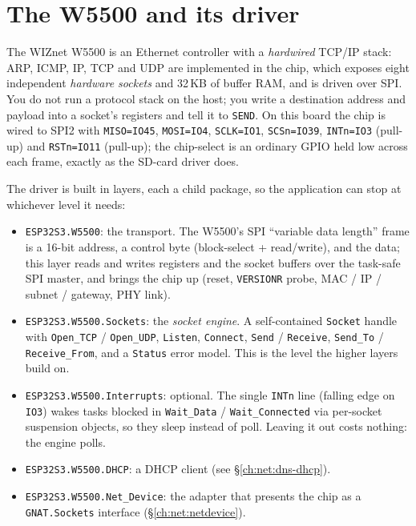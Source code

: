 \section{The W5500 and its driver}
\label{ch:net:w5500}

The WIZnet W5500 is an Ethernet controller with a \emph{hardwired} TCP/IP stack:
ARP, ICMP, IP, TCP and UDP are implemented in the chip, which exposes eight
independent \emph{hardware sockets} and 32\,KB of buffer RAM, and is driven over
SPI. You do not run a protocol stack on the host; you write a destination address
and payload into a socket's registers and tell it to \texttt{SEND}. On this board
the chip is wired to SPI2 with \texttt{MISO=IO45}, \texttt{MOSI=IO4},
\texttt{SCLK=IO1}, \texttt{SCSn=IO39}, \texttt{INTn=IO3} (pull-up) and
\texttt{RSTn=IO11} (pull-up); the chip-select is an ordinary GPIO held low across
each frame, exactly as the SD-card driver does.

The driver is built in layers, each a child package, so the application can stop at
whichever level it needs:

\begin{itemize}[nosep]
\item \texttt{ESP32S3.W5500}: the transport. The W5500's SPI ``variable data
length'' frame is a 16-bit address, a control byte (block-select + read/write), and
the data; this layer reads and writes registers and the socket buffers over the
task-safe SPI master, and brings the chip up (reset, \texttt{VERSIONR} probe, MAC /
IP / subnet / gateway, PHY link).
\item \texttt{ESP32S3.W5500.Sockets}: the \emph{socket engine}. A self-contained
\texttt{Socket} handle with \texttt{Open\_TCP} / \texttt{Open\_UDP},
\texttt{Listen}, \texttt{Connect}, \texttt{Send} / \texttt{Receive},
\texttt{Send\_To} / \texttt{Receive\_From}, and a \texttt{Status} error model. This
is the level the higher layers build on.
\item \texttt{ESP32S3.W5500.Interrupts}: optional. The single \texttt{INTn} line
(falling edge on \texttt{IO3}) wakes tasks blocked in \texttt{Wait\_Data} /
\texttt{Wait\_Connected} via per-socket suspension objects, so they sleep instead
of poll. Leaving it out costs nothing: the engine polls.
\item \texttt{ESP32S3.W5500.DHCP}: a DHCP client (see
\S\ref{ch:net:dns-dhcp}).
\item \texttt{ESP32S3.W5500.Net\_Device}: the adapter that presents the chip as a
\texttt{GNAT.Sockets} interface (\S\ref{ch:net:netdevice}).
\end{itemize}

